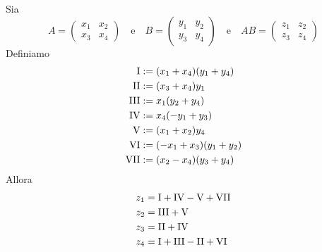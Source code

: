 \documentclass[../main.tex]{subfiles}
\begin{document}
\begin{definition}
    Sia
    \begin{equation*}
        A = \begin{pmatrix} x_1 & x_2 \\ x_3 & x_4 \end{pmatrix} \quad \text{e} \quad B = \begin{pmatrix} y_1 & y_2 \\ y_3 & y_4 \end{pmatrix} \quad \text{e} \quad AB = \begin{pmatrix} z_1 & z_2 \\ z_3 & z_4 \end{pmatrix}
    \end{equation*}
    Definiamo
    \begin{align*}
        \RomanNumber 1 & := (x_1 + x_4)(y_1 + y_4)  \\
        \RomanNumber 2 & := (x_3 + x_4)y_1          \\
        \RomanNumber 3 & := x_1(y_2 + y_4)          \\
        \RomanNumber 4 & := x_4(-y_1 + y_3)         \\
        \RomanNumber 5 & := (x_1 + x_2)y_4          \\
        \RomanNumber 6 & := (-x_1 + x_3)(y_1 + y_2) \\
        \RomanNumber 7 & := (x_2 - x_4)(y_3 + y_4)
    \end{align*}
    Allora
    \begin{align*}
        z_1 & = \RomanNumber 1 + \RomanNumber 4 - \RomanNumber 5 + \RomanNumber 7 \\
        z_2 & = \RomanNumber 3 + \RomanNumber 5                                   \\
        z_3 & = \RomanNumber 2 + \RomanNumber 4                                   \\
        z_4 & = \RomanNumber 1 + \RomanNumber 3 - \RomanNumber 2 + \RomanNumber 6
    \end{align*}
\end{definition}
\end{document}
